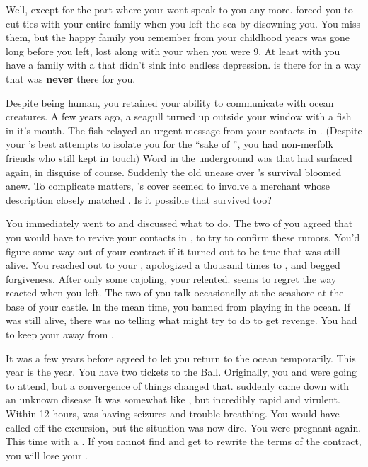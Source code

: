 \documentclass[char]{NeptuneBall}
\begin{document}
Well, except for the part where your \cKing{\parent} wont speak to you any more. \cKing{\They} forced you to cut ties with your entire family when you left the sea by disowning you. You miss them, but the happy family you remember from your childhood years was gone long before you left, lost along with your \cAthena{\parent} when you were 9. At least with \cEric{} you have a family with a \cEric{\parent} that didn't sink into endless depression. \cEric{} is there for \cWillow{} in a way that \cKing{} was {\bf never} there for you.

Despite being human, you retained your ability to communicate with ocean creatures. A few years ago, a seagull turned up outside your window with a fish in it's mouth. The fish relayed an urgent message from your contacts in \pAtlantis{}. (Despite your \cKing{\parent}'s best attempts to isolate you for the ``sake of \pAtlantis{}'', you had non-merfolk friends who still kept in touch) Word in the underground was that \cWitch{} had surfaced again, in disguise of course.  Suddenly the old unease over \cWitch{}'s survival bloomed anew. To complicate matters, \cWitch{}'s cover seemed to involve a merchant whose description closely matched \cSlave{}. Is it possible that \cSlave{\they} survived too? 

You immediately went to \cEric{} and discussed what to do. The two of you agreed that you would have to revive your contacts in \pAtlantis{}, to try to confirm these rumors. You'd figure some way out of your contract if it turned out to be true that \cWitch{} was still alive. You reached out to your \cKing{\parent}, apologized a thousand times to \cKing{\them}, and begged \cKing{\their} forgiveness. After only some cajoling, your \cKing{\parent} relented. \cKing{\They} seems to regret the way \cKing{\they} reacted when you left. The two of you talk occasionally at the seashore at the base of your castle.  In the mean time, you banned \cWillow{} from playing in the ocean. If \cWitch{} was still alive, there was no telling what \cWitch{\they} might try to do to get revenge. You had to keep your \cWillow{\offspring} away from \cWitch{}.

It was a few years before \cKing{\King} \cKing{} agreed to let you return to the ocean temporarily. This year is the year. You have two tickets to the \cExExKing{} Ball. Originally, you and \cEric{} were going to attend, but a convergence of things changed that. \cEric{} suddenly came down with an unknown disease.It was somewhat like \cPolio{}, but incredibly rapid and virulent. Within 12 hours, \cEric{} was having seizures and trouble breathing. You would have called off the excursion, but the situation was now dire. You were pregnant again. This time with a \cArielsSon{\offspring}. If you cannot find \cWitch{} and get \cWitch{\them} to rewrite the terms of the contract, you will lose your \cArielsSon{\offspring} \cArielsSon{}.
\end{document}
